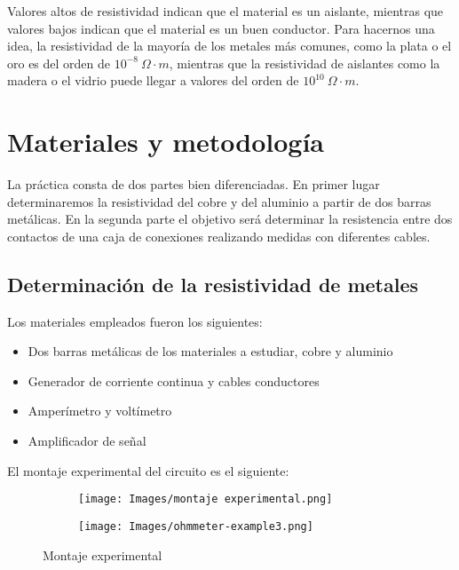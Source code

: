 \documentclass[a4paper,12pt,titlepage]{article}
\begin{document}
Valores altos de resistividad indican que el material es un aislante, mientras que valores bajos indican que el material es un buen conductor. Para hacernos una idea, la resistividad de la mayoría de los metales más comunes, como la plata o el oro es del orden de $10^{-8}\: \Omega \cdot m$, mientras que la resistividad de aislantes como la madera o el vidrio puede llegar a valores del orden de $10^{10}\: \Omega \cdot m$.

\section{Materiales y metodología}

La práctica consta de dos partes bien diferenciadas. En primer lugar determinaremos la resistividad del cobre y del aluminio a partir de dos barras metálicas. En la segunda parte el objetivo será determinar la resistencia entre dos contactos de una caja de conexiones realizando medidas con diferentes cables.

\subsection{Determinación de la resistividad de metales}

Los materiales empleados fueron los siguientes:

\begin{itemize}
    \item Dos barras metálicas de los materiales a estudiar, cobre y aluminio
    \item Generador de corriente continua y cables conductores
    \item Amperímetro y voltímetro
    \item Amplificador de señal
\end{itemize}

El montaje experimental del circuito es el siguiente:

\begin{figure}[h!]
    \begin{subfigure}{0.5\textwidth}
        \centering
        \texttt{[image: Images/montaje experimental.png]}
    \end{subfigure}
    \begin{subfigure}{0.42\textwidth}
        \centering
        \texttt{[image: Images/ohmmeter-example3.png]}
    \end{subfigure}
    \caption{Montaje experimental}
    \label{Circuito}
\end{figure}
\end{document}
